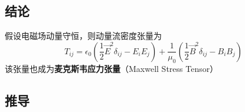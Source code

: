 
\subsection{结论}

假设电磁场动量守恒，则动量流密度张量为
\begin{equation}
{T_{ij}} = {\epsilon_0}\left( {\frac{1}{2}{{\vec E}^2}{\delta _{ij}} - {E_i}{E_j}} \right) + \frac{1}{{{\mu _0}}}\left( {\frac{1}{2}{{\vec B}^2}{\delta _{ij}} - {B_i}{B_j}} \right)
\end{equation} 
该张量也成为\textbf{麦克斯韦应力张量}（Maxwell Stress Tensor）

\subsection{推导}	

